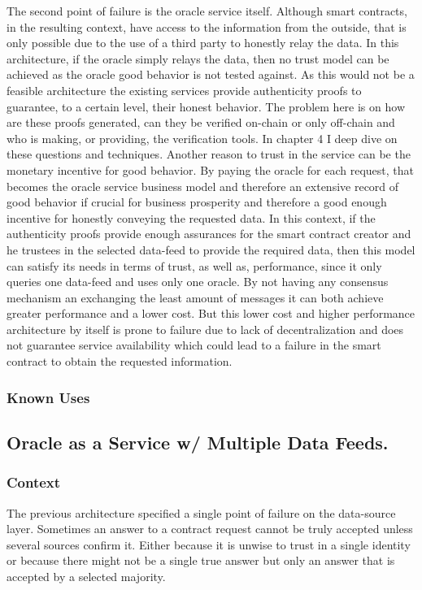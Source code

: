 The second point of failure is the oracle service itself. Although smart contracts, in the resulting context, have access to the information from the outside, that is only possible due to the use of a third party to honestly relay the data. In this architecture, if the oracle simply relays the data, then no trust model can be achieved as the oracle good behavior is not tested against. As this would not be a feasible architecture the existing services provide authenticity proofs to guarantee, to a certain level, their honest behavior. The problem here is on how are these proofs generated, can they be verified on-chain or only off-chain and who is making, or providing, the verification tools. In chapter 4 I deep dive on these questions and techniques. Another reason to trust in the service can be the monetary incentive for good behavior. By paying the oracle for each request, that becomes the oracle service business model and therefore an extensive record of good behavior if crucial for business prosperity and therefore a good enough incentive for honestly conveying the requested data.
In this context, if the authenticity proofs provide enough assurances for the smart contract creator and he trustees in the selected data-feed to provide the required data, then this model can satisfy its needs in terms of trust, as well as, performance, since it only queries one data-feed and uses only one oracle. By not having any consensus mechanism an exchanging the least amount of messages it can both achieve greater performance and a lower cost. But this lower cost and higher performance architecture by itself  is prone to failure due to lack of decentralization and does not guarantee service availability which could lead to a failure in the smart contract to obtain the requested information.



\subsubsection{Known Uses}


\subsection{Oracle as a Service w/ Multiple Data Feeds.}

\subsubsection{Context}
The previous architecture specified a single point of failure on the data-source layer. Sometimes an answer to a contract request cannot be truly accepted unless several sources confirm it. Either because it is unwise to trust in a single identity or because there might not be a single true answer but only an answer that is accepted by a selected majority.

